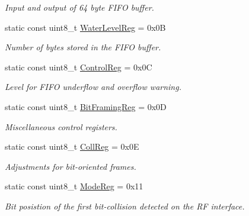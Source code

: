 \begin{DoxyCompactItemize}
\begin{DoxyCompactList}\small\item\em Input and output of 64 byte F\+I\+FO buffer. \end{DoxyCompactList}\item 
\mbox{\label{classMFRC522_ad7b977a0fecf852e1a564a0339b470b4}} 
static const uint8\+\_\+t \hyperlink{classMFRC522_ad7b977a0fecf852e1a564a0339b470b4}{Water\+Level\+Reg} = 0x0B
\begin{DoxyCompactList}\small\item\em Number of bytes stored in the F\+I\+FO buffer. \end{DoxyCompactList}\item 
\mbox{\label{classMFRC522_a18ecd5d31d1892b81c7fba4d86cfe509}} 
static const uint8\+\_\+t \hyperlink{classMFRC522_a18ecd5d31d1892b81c7fba4d86cfe509}{Control\+Reg} = 0x0C
\begin{DoxyCompactList}\small\item\em Level for F\+I\+FO underflow and overflow warning. \end{DoxyCompactList}\item 
\mbox{\label{classMFRC522_ae03b342f943f3cba80fd98c9db921b1b}} 
static const uint8\+\_\+t \hyperlink{classMFRC522_ae03b342f943f3cba80fd98c9db921b1b}{Bit\+Framing\+Reg} = 0x0D
\begin{DoxyCompactList}\small\item\em Miscellaneous control registers. \end{DoxyCompactList}\item 
\mbox{\label{classMFRC522_a6bbad73e1fd964473610adf1f3eb8a77}} 
static const uint8\+\_\+t \hyperlink{classMFRC522_a6bbad73e1fd964473610adf1f3eb8a77}{Coll\+Reg} = 0x0E
\begin{DoxyCompactList}\small\item\em Adjustments for bit-\/oriented frames. \end{DoxyCompactList}\item 
\mbox{\label{classMFRC522_a0509425924d23eb15b82fe70409e1afd}} 
static const uint8\+\_\+t \hyperlink{classMFRC522_a0509425924d23eb15b82fe70409e1afd}{Mode\+Reg} = 0x11
\begin{DoxyCompactList}\small\item\em Bit posistion of the first bit-\/collision detected on the RF interface. \end{DoxyCompactList}\item 

\end{DoxyCompactItemize}
